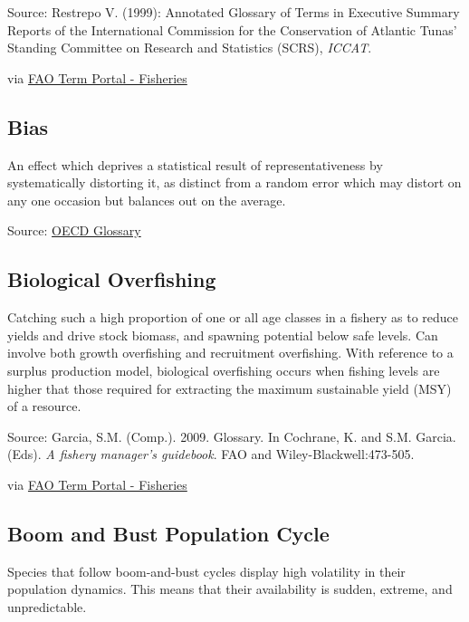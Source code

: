\documentclass[
  11pt,
]{book}
\begin{document}
Source: Restrepo V. (1999): Annotated Glossary of Terms in Executive Summary Reports of the International Commission for the Conservation of Atlantic Tunas' Standing Committee on Research and Statistics (SCRS), \emph{ICCAT}.

via \href{http://www.fao.org/fishery/glossary/en}{FAO Term Portal - Fisheries}

\hypertarget{bias}{%
\subsection{Bias}\label{bias}}

An effect which deprives a statistical result of representativeness by systematically distorting it, as distinct from a random error which may distort on any one occasion but balances out on the average.

Source: \href{https://stats.oecd.org/glossary/detail.asp?ID=3605}{OECD Glossary}

\hypertarget{biological-overfishing}{%
\subsection{Biological Overfishing}\label{biological-overfishing}}

Catching such a high proportion of one or all age classes in a fishery as to reduce yields and drive stock biomass, and spawning potential below safe levels. Can involve both growth overfishing and recruitment overfishing. With reference to a surplus production model, biological overfishing occurs when fishing levels are higher that those required for extracting the maximum sustainable yield (MSY) of a resource.

Source: Garcia, S.M. (Comp.). 2009. Glossary. In Cochrane, K. and S.M. Garcia. (Eds). \emph{A fishery manager's guidebook}. FAO and Wiley-Blackwell:473-505.

via \href{http://www.fao.org/fishery/glossary/en}{FAO Term Portal - Fisheries}

\hypertarget{boom-and-bust-population-cycle}{%
\subsection{Boom and Bust Population Cycle}\label{boom-and-bust-population-cycle}}

Species that follow boom-and-bust cycles display high volatility in their population dynamics. This means that their availability is sudden, extreme, and unpredictable.
\end{document}
